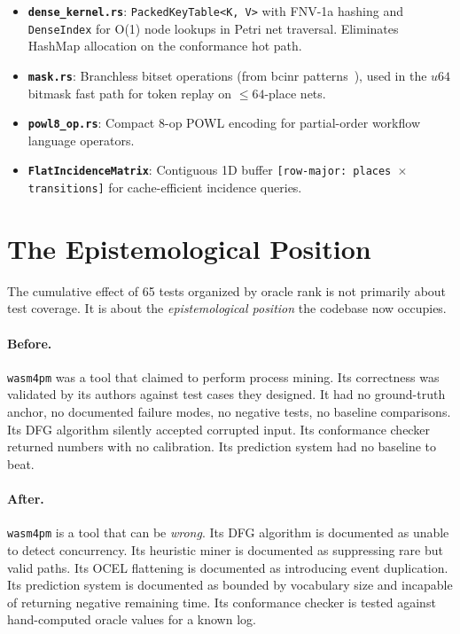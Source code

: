 \documentclass[12pt,a4paper]{article}
\begin{document}
\begin{itemize}
  \item \textbf{\texttt{dense\_kernel.rs}}: \texttt{PackedKeyTable\textless K, V\textgreater} with FNV-1a hashing
    and \texttt{DenseIndex} for O(1) node lookups in Petri net traversal.
    Eliminates HashMap allocation on the conformance hot path.
  \item \textbf{\texttt{mask.rs}}: Branchless bitset operations (from bcinr
    patterns~\cite{bcinr2025}), used in the $u64$ bitmask fast path for
    token replay on $\le 64$-place nets.
  \item \textbf{\texttt{powl8\_op.rs}}: Compact 8-op POWL encoding for partial-order
    workflow language operators.
  \item \textbf{\texttt{FlatIncidenceMatrix}}: Contiguous 1D buffer \texttt{[row-major:
    places $\times$ transitions]} for cache-efficient incidence queries.
\end{itemize}

\section{The Epistemological Position}
\label{sec:epistemology}

The cumulative effect of 65 tests organized by oracle rank is not primarily about
test coverage. It is about the \emph{epistemological position} the codebase now
occupies.

\paragraph{Before.} \texttt{wasm4pm} was a tool that claimed to perform process
mining. Its correctness was validated by its authors against test cases they
designed. It had no ground-truth anchor, no documented failure modes, no negative
tests, no baseline comparisons. Its DFG algorithm silently accepted corrupted
input. Its conformance checker returned numbers with no calibration. Its
prediction system had no baseline to beat.

\paragraph{After.} \texttt{wasm4pm} is a tool that can be \emph{wrong}. Its DFG
algorithm is documented as unable to detect concurrency. Its heuristic miner is
documented as suppressing rare but valid paths. Its OCEL flattening is documented
as introducing event duplication. Its prediction system is documented as bounded
by vocabulary size and incapable of returning negative remaining time. Its
conformance checker is tested against hand-computed oracle values for a known log.
\end{document}
